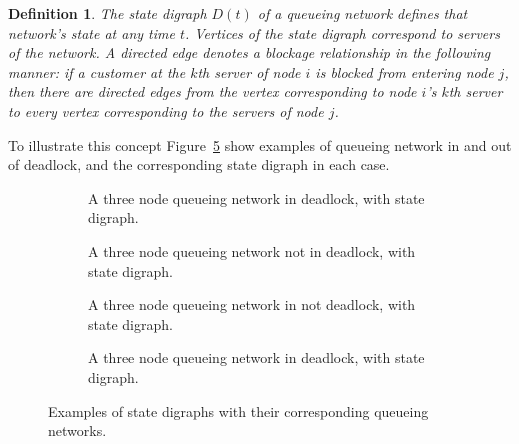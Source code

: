 \documentclass{article}
\newtheorem{definition}{Definition}
\numberwithin{equation}{section}
\begin{document}
\begin{definition}
The state digraph $D(t)$ of a queueing network defines that network's state at any time $t$.
Vertices of the state digraph correspond to servers of the network.
A directed edge denotes a blockage relationship in the following manner: if a customer at the $k$th server of node $i$ is blocked from entering node $j$, then there are directed edges from the vertex corresponding to node $i$'s $k$th server to every vertex corresponding to the servers of node $j$.
\end{definition}

To illustrate this concept Figure~\ref{fig:exampledigraphs} show examples of queueing network in and out of deadlock, and the corresponding state digraph in each case.

\begin{figure}[!htbp]
\begin{center}
  \begin{subfigure}{0.45\textwidth}
    \begin{center}
      
    \end{center}
    \caption{A three node queueing network in deadlock, with state digraph.}
    \label{fig:exampledigraph_deadlock}
  \end{subfigure}
  \hspace{6 mm}
  \begin{subfigure}{0.45\textwidth}
    \begin{center}
      
    \end{center}
    \caption{A three node queueing network not in deadlock, with state digraph.}
    \label{fig:exampledigraph_nodeadlock}
    \vspace{6 mm}
  \end{subfigure}
  \begin{subfigure}{0.45\textwidth}
    \begin{center}
      
    \end{center}
    \caption{A three node queueing network in not deadlock, with state digraph.}
    \label{fig:exampledigraph_nodeadlock}
  \end{subfigure}
  \hspace{6 mm}
  \begin{subfigure}{0.45\textwidth}
    \begin{center}
      
    \end{center}
    \caption{A three node queueing network in deadlock, with state digraph.}
    \label{fig:exampledigraph_nodeadlock}
    \vspace{6 mm}
  \end{subfigure}
  \end{center}
  \caption{Examples of state digraphs with their corresponding queueing networks.}
  \label{fig:exampledigraphs}
\end{figure}
\end{document}
